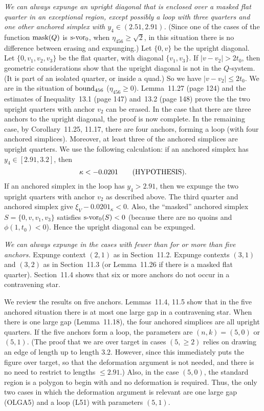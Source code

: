 \documentclass[11pt]{amsart}
\def\op#1{{\text{#1}}}
\def\text{\hbox}
\begin{document}
{\it We can always expunge an upright diagonal that is enclosed
over a masked flat quarter in an exceptional region, except possibly a loop with three quarters and one other anchored simplex with $y_4\in (2.51,2.91)$.}  (Since one of the cases of
the function $\op{mask}(Q)$ is $\op{s-vor}_0$, when
$\eta_{456}\ge\sqrt2$, in this situation there is no difference between erasing and expunging.) Let $\{0,v\}$ be the upright
diagonal.  Let $\{0,v_1,v_2,v_3\}$ be the flat quarter, with
diagonal $\{v_1,v_3\}$.  If $|v-v_2|>2t_0$, then geometric
considerations show that the upright diagonal is not in the
$Q$-system.  (It is part of an isolated quarter, or inside
a quad.)  So we have $|v-v_2|\le 2t_0$.  We are in the situation of
$\op{bound}_{456}$ ($\eta_{456}\ge0$).  
Lemma~11.27 (page 124) and the estimates
of Inequality~13.1 (page 147) and~13.2 (page 148)
prove the the two upright quarters with anchor $v_2$ can
be erased.  In the case that there are three anchors to the upright diagonal, the proof is now complete.  In the remaining case, by Corollary~11.25, 11.17, there are four anchors, forming a loop (with four anchored simplices).  Moreover, at least three of the anchored simplices are upright quarters.  We use the following
calculation: if an anchored simplex has $y_4\in [2.91,3.2]$, then
\begin{equation}\label{eqn:0201}
 \kappa < -0.0201\qquad\text{(HYPOTHESIS)}.
\end{equation}
If an anchored simplex
in the loop has $y_4> 2.91$, then we expunge the two upright quarters with anchor $v_2$ as described above. The third quarter and
anchored simplex give
  $\xi_V - 0.0201_\kappa < 0$.
Also, the ``masked''
anchored simplex $S=\{0,v,v_1,v_3\}$ satisfies $\op{s-vor}_0(S) <0$
(because there are no quoins and $\phi(1,t_0)<0$).
Hence the upright diagonal can be expunged.

{\it We can always expunge in the cases with fewer than for or more than five anchors.}  Expunge context $(2,1)$ as in Section~11.2.  Expunge contexts $(3,1)$ and $(3,2)$
as in Section~11.3 (or Lemma~11.26 if there is a masked flat
quarter).  Section~11.4 shows that six or more anchors do not
occur in a contravening star.  

We review the results on five anchors. 
Lemmas~11.4, 11.5 show that in the five anchored situation there is at most one large gap in a contravening star.  When there is one large gap (Lemma~11.18), the four anchored simplices are all upright quarters. If the five anchors form a loop, the parameters are $(n,k)=(5,0)$ or $(5,1)$.  (The proof that we are over target in cases $(5,\ge2)$ relies on drawing an edge of length up to length $3.2$.  However, since this immediately puts the figure over target, so that the deformation argument is not needed, and there is no need to restrict to lengths $\le 2.91$.) Also, in the case $(5,0)$, the standard region is a polygon to begin with and no deformation is required.  Thus, the only two cases in which the deformation argument is relevant are one large gap (OLGA5) and a loop (L51) with parameters $(5,1)$.
\end{document}

